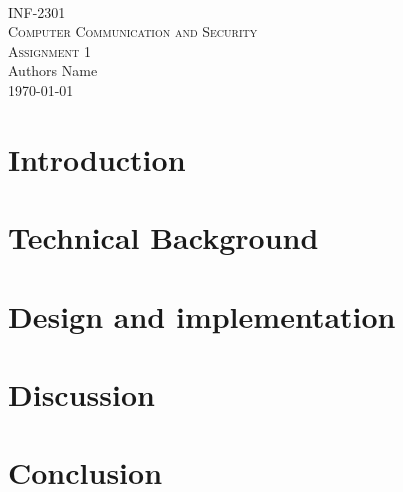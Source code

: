 


\def \courseCode {INF-2301}
\def \course {Computer Communication and Security}
\def \thetitle {Assignment 1}
\def \theauthor {Authors Name}
\def \pagecount {2}




\begin{center}
\textsc{\\[1.0cm]}
\textsc{\Large \courseCode\\ \course}\\[1.0cm]
\textsc{\LARGE \thetitle}\\[1.0cm]
\LARGE{\theauthor} \\
{\large \today}
\end{center}

\section{Introduction}

\section{Technical Background}

\section{Design and implementation}

\section{Discussion}

\section{Conclusion}



